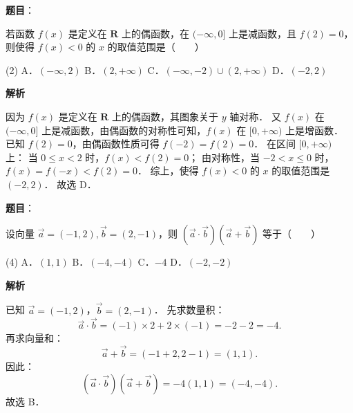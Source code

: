 \begin{answer}

\textbf{题目}：

若函数 $f(x)$ 是定义在 $\mathbf{R}$ 上的偶函数，在 $(-\infty, 0]$ 上是减函数，且 $f(2) = 0$，则使得 $f(x) < 0$ 的 $x$ 的取值范围是\mbox{（　　）}

\begin{gkopts}(2)
\task A．$(-\infty, 2)$
\task B．$(2, +\infty)$
\task C．$(-\infty, -2) \cup (2, +\infty)$
\task D．$(-2, 2)$
\end{gkopts}

\textbf{解析}

因为 $f(x)$ 是定义在 $\mathbf{R}$ 上的偶函数，其图象关于 $y$ 轴对称．
又 $f(x)$ 在 $(-\infty, 0]$ 上是减函数，由偶函数的对称性可知，$f(x)$ 在 $[0, +\infty)$ 上是增函数．
已知 $f(2) = 0$，由偶函数性质可得 $f(-2) = f(2) = 0$．
在区间 $[0, +\infty)$ 上：
当 $0 \leqslant x < 2$ 时，$f(x) < f(2) = 0$；
由对称性，当 $-2 < x \leqslant 0$ 时，$f(x) = f(-x) < f(2) = 0$．
综上，使得 $f(x) < 0$ 的 $x$ 的取值范围是 $(-2, 2)$．
故选 D．


\end{answer}
\begin{answer}

\textbf{题目}：

设向量 $\vec{a} = (-1, 2), \vec{b} = (2, -1)$，则 $(\vec{a} \cdot \vec{b})(\vec{a} + \vec{b})$ 等于\mbox{（　　）}

\begin{gkopts}(4)
\task A．$(1, 1)$
\task B．$(-4, -4)$
\task C．$-4$
\task D．$(-2, -2)$
\end{gkopts}

\textbf{解析}

已知 $\vec{a} = (-1, 2)$，$\vec{b} = (2, -1)$．
先求数量积：
\nopagebreak[4]
\[
\vec{a} \cdot \vec{b} = (-1) \times 2 + 2 \times (-1) = -2 - 2 = -4.
\]
再求向量和：
\nopagebreak[4]
\[
\vec{a} + \vec{b} = (-1 + 2, 2 - 1) = (1, 1).
\]
因此：
\nopagebreak[4]
\[
(\vec{a} \cdot \vec{b})(\vec{a} + \vec{b}) = -4(1, 1) = (-4, -4).
\]
故选 B．


\end{answer}
